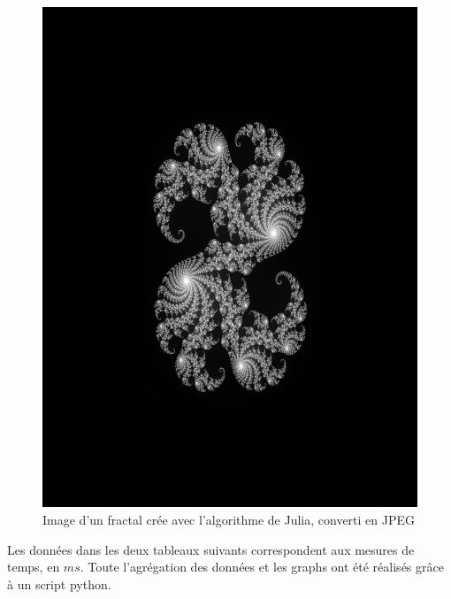 \documentclass[12pt,a4paper,oneside, titlepage]{report}
\begin{document}
		\begin{figure}[H]
			\centering
			\includegraphics[scale=0.20]{images/julia_thread_simple}
			\caption {Image d'un fractal crée avec l'algorithme de Julia, converti en JPEG}
		\end{figure}

		\newpage

		Les données dans les deux tableaux suivants correspondent aux mesures de temps, en $ms$. Toute l'agrégation des données et les graphs ont été réalisés grâce à un script python.
\end{document}
